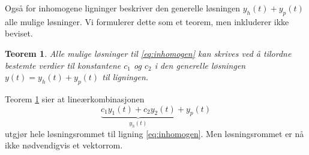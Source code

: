 \documentclass{article}
\newtheorem{thm}{Teorem}\surroundwithmdframed{thm}
\theoremstyle{definition}
\theoremstyle{remark}
\newenvironment{merk}
{\pushQED{\qed}\renewcommand{\qedsymbol}{$\triangle$}\merkx}
{\popQED\endmerkx}
\begin{document}
\begin{multicols*}{2}
Også for inhomogene ligninger beskriver den generelle løsningen $y_h(t) + y_p(t)$ alle mulige løsninger. Vi formulerer dette som et teorem, men inkluderer ikke beviset.

\begin{thm} \label{thm:alle_mulige_losn_inhomogen}
  Alle mulige løsninger til \eqref{eq:inhomogen} kan skrives ved å tilordne bestemte verdier til konstantene $c_1$ og $c_2$ i den generelle løsningen $y(t) = y_h(t) + y_p(t)$ til ligningen.
\end{thm}

\begin{merk}
  Teorem \ref{thm:alle_mulige_losn_inhomogen} sier at lineærkombinasjonen 
  \begin{equation*}
    \underbrace{c_1y_1(t) + c_2y_2(t)}_{y_h(t)} + y_p(t)  
  \end{equation*}
  utgjør hele løsningsrommet til ligning \eqref{eq:inhomogen}. Men løsningsrommet er nå ikke nødvendigvis et vektorrom.
\end{merk}


\end{multicols*}
\end{document}
